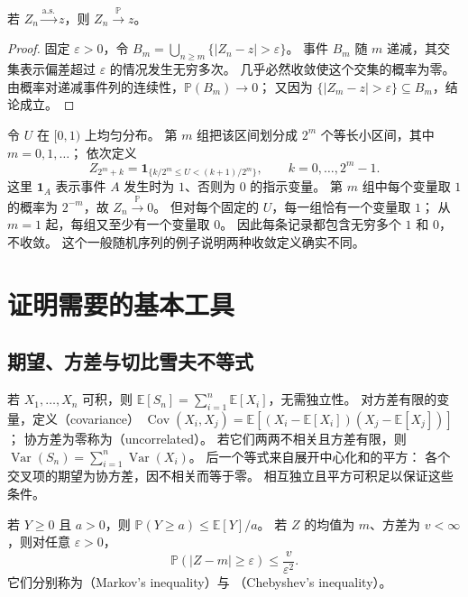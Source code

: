 \documentclass[UTF8]{ctexart}
\begin{document}
\begin{proposition}[几乎必然收敛蕴含依概率收敛]
\label{prop:lln-as-implies-probability}
若 $Z_n\xrightarrow{\mathrm{a.s.}}z$，则 $Z_n\xrightarrow{\mathbb P}z$。
\end{proposition}

\begin{proof}
固定 $\varepsilon>0$，令
$B_m=\bigcup_{n\geq m}\{|Z_n-z|>\varepsilon\}$。
事件 $B_m$ 随 $m$ 递减，其交集表示偏差超过 $\varepsilon$ 的情况发生无穷多次。
几乎必然收敛使这个交集的概率为零。
由概率对递减事件列的连续性，$\mathbb P(B_m)\to0$；
又因为 $\{|Z_m-z|>\varepsilon\}\subseteq B_m$，结论成立。
\end{proof}

\begin{example}[依概率收敛不一定几乎必然收敛]
\label{ex:lln-typewriter}
令 $U$ 在 $[0,1)$ 上均匀分布。
第 $m$ 组把该区间划分成 $2^m$ 个等长小区间，其中 $m=0,1,\ldots$；
依次定义
\[
  Z_{2^m+k}
  =\mathbf1_{\{k/2^m\leq U<(k+1)/2^m\}},
  \qquad k=0,\ldots,2^m-1.
\]
这里 $\mathbf1_A$ 表示事件 $A$ 发生时为 $1$、否则为 $0$ 的指示变量。
第 $m$ 组中每个变量取 $1$ 的概率为 $2^{-m}$，故 $Z_n\xrightarrow{\mathbb P}0$。
但对每个固定的 $U$，每一组恰有一个变量取 $1$；
从 $m=1$ 起，每组又至少有一个变量取 $0$。
因此每条记录都包含无穷多个 $1$ 和 $0$，不收敛。
这个一般随机序列的例子说明两种收敛定义确实不同。
\end{example}

\section{证明需要的基本工具}
\label{sec:lln-basic-tools}

\subsection{期望、方差与切比雪夫不等式}

若 $X_1,\ldots,X_n$ 可积，则
$\mathbb E[S_n]=\sum_{i=1}^n\mathbb E[X_i]$，无需独立性。
对方差有限的变量，定义（covariance）
$\operatorname{Cov}(X_i,X_j)
=\mathbb E[(X_i-\mathbb E[X_i])(X_j-\mathbb E[X_j])]$；
协方差为零称为（uncorrelated）。
若它们两两不相关且方差有限，则
$\operatorname{Var}(S_n)=\sum_{i=1}^n\operatorname{Var}(X_i)$。
后一个等式来自展开中心化和的平方：
各个交叉项的期望为协方差，因不相关而等于零。
相互独立且平方可积足以保证这些条件。

\begin{lemma}[马尔可夫与切比雪夫不等式]
\label{lem:lln-chebyshev}
若 $Y\geq0$ 且 $a>0$，则
$\mathbb P(Y\geq a)\leq\mathbb E[Y]/a$。
若 $Z$ 的均值为 $m$、方差为 $v<\infty$，则对任意 $\varepsilon>0$，
\begin{equation}
  \mathbb P(|Z-m|\geq\varepsilon)\leq\frac{v}{\varepsilon^2}.
  \label{eq:lln-chebyshev}
\end{equation}
它们分别称为（Markov's inequality）与
（Chebyshev's inequality）。
\end{lemma}
\end{document}
